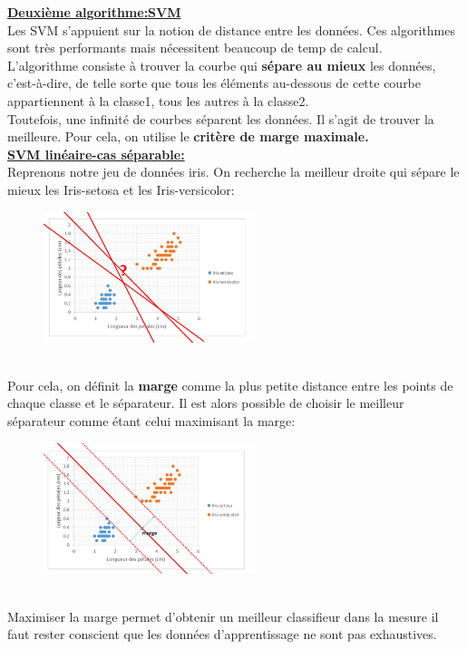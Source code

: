 \documentclass[11pt,twoside,openany,x11names,svgnames]{memoir}
\begin{document}
\begin{itemize}
		{{\large{\textbf{\underline{Deuxième algorithme:SVM}}}}} \\
		Les SVM s'appuient sur la notion de distance entre les données. Ces algorithmes sont très performants mais nécessitent beaucoup de temp de calcul.\\
		L'algorithme consiste à trouver la courbe qui \textbf{sépare au mieux} les données, c'est-à-dire, de telle sorte que tous les éléments au-dessous de cette courbe appartiennent à la classe1, tous les autres à la classe2.\\
		Toutefois, une infinité de courbes séparent les données. Il s'agit de trouver la meilleure. Pour cela, on utilise le \textbf{critère de marge maximale.}\\
		{{\large{\textbf{\underline{SVM linéaire-cas séparable:}}}}} \\
		Reprenons notre jeu de données iris. On recherche la meilleur droite qui sépare le mieux les Iris-setosa et les Iris-versicolor: \\
\begin{figure}[htbp]
	\centering
		\includegraphics[width=0.55\textwidth]{img8_iris.png}
	\label{}
\end{figure} \\
Pour cela, on définit la \textbf{marge} comme la plus petite distance entre les points de chaque classe et le séparateur. Il est alors possible de choisir le meilleur séparateur comme étant celui maximisant la marge: \\

		\begin{figure}[htbp]
	\centering
		\includegraphics[width=0.55\textwidth]{img9_iris.png}
	\label{}
\end{figure} \\
Maximiser la marge permet d'obtenir un meilleur classifieur dans la mesure il faut rester conscient que les données d'apprentissage ne sont pas exhaustives.
		

\end{itemize}
\end{document}
